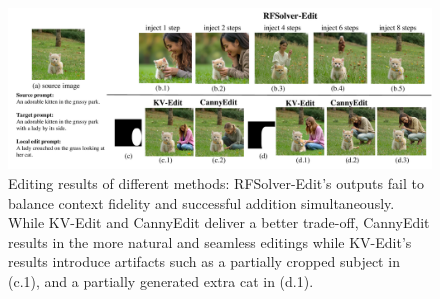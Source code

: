 \documentclass{article}
\begin{document}
\begin{figure}[t]

    \centering
    \includegraphics[width=0.9\linewidth]{figures/cat3.pdf}
      \caption{Editing results of different methods: RFSolver-Edit's outputs fail to balance context fidelity and successful addition simultaneously. While KV-Edit and CannyEdit deliver a better trade-off, CannyEdit results in the more natural and seamless editings while KV-Edit's results introduce artifacts such as a {partially cropped subject} in (c.1), and {a partially generated extra cat} in (d.1).}
    \label{fig2}
\end{figure}
\end{document}
